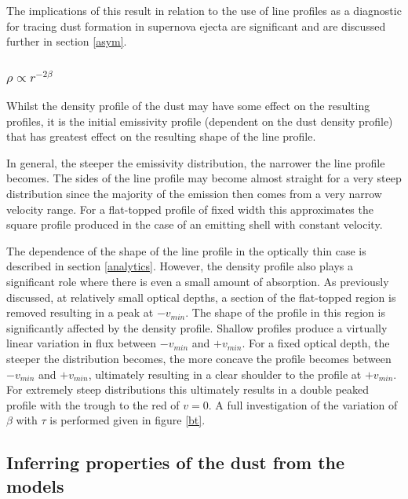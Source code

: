 \documentclass[useAMS,usenatbib,usegraphicx]{mnras}
\begin{document}
The implications of this result in relation to the use of line profiles as a diagnostic for tracing dust formation in supernova ejecta are significant and are discussed further in section \ref{asym}.


\subsubsection{$\rho \propto r^{-2\beta}$}
\label{beta}
Whilst the density profile of the dust may have some effect on the resulting profiles, it is the initial emissivity profile (dependent on the dust density profile) that has greatest effect on the resulting shape of the line profile.

In general, the steeper the emissivity distribution, the narrower the line profile becomes.  The sides of the line profile may become almost straight for a very steep distribution since the majority of the emission then comes from a very narrow velocity range.  For a flat-topped profile of fixed width this approximates the square profile produced in the case of an emitting shell with constant velocity.

The dependence of the shape of the line profile in the optically thin case is described in section \ref{analytics}.  However, the density profile also plays a significant role where there is even a small amount of absorption.  As previously discussed, at relatively small optical depths, a section of the flat-topped region is removed resulting in a peak at $-v_{min}$.  The shape of the profile in this region is significantly affected by the density profile.  Shallow profiles produce a virtually linear variation in flux between $-v_{min}$ and $+v_{min}$.  For a fixed optical depth, the steeper the distribution becomes, the more concave the profile becomes between $-v_{min}$ and $+v_{min}$, ultimately resulting in a clear shoulder to the profile at $+v_{min}$.  For extremely steep distributions this ultimately results in a double peaked profile with the trough to the red of $v=0$.  A full investigation of the variation of $\beta$ with $\tau$ is performed given in figure \ref{bt}.

\subsection{Inferring properties of the dust from the models}
\end{document}
